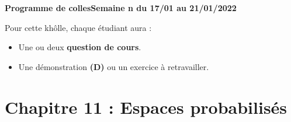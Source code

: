 \documentclass[twoside,a4paper,french,10pt]{VcCours}
\begin{document}

\begin{center}
\large\bf
Programme de collesSemaine n du 17/01 au 21/01/2022
\end{center}
\separationTitre


Pour cette khôlle, chaque étudiant aura :
\begin{itemize}
\item Une ou deux \textbf{question de cours}.
\item Une démonstration \textbf{(D)} ou un exercice à retravailler.
\end{itemize} 

\section*{Chapitre 11 : Espaces probabilisés}
\end{document}
